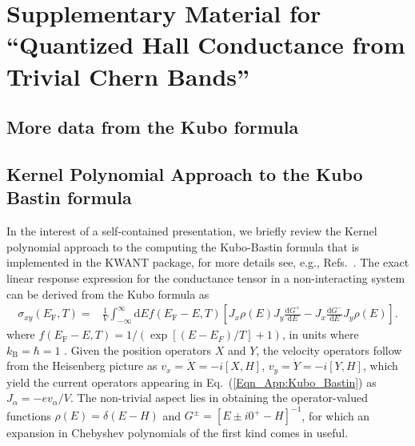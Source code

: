 \documentclass[aps,prl,amsmath,amssymb,twocolumn]{revtex4-2}
\newcommand{\eq}[1]{Eq.~(\ref{#1})}
\begin{document}
\appendix

\onecolumngrid
\section{Supplementary Material for ``Quantized Hall Conductance from Trivial Chern Bands'' }
\subsection{More data from the Kubo formula} 

\subsection{Kernel Polynomial Approach to the Kubo Bastin formula} 
In the interest of a self-contained presentation, we briefly review the Kernel polynomial approach to the computing the Kubo-Bastin formula that is implemented in the KWANT package, for more details see, e.g., Refs.~\cite{Kubo_bastin_KPM_1, Kubo_bastin_KPM_2, KPM_Review}. The exact linear response expression for the conductance tensor in a non-interacting system can be derived from the Kubo formula as 
\begin{align}
\sigma_{xy}(E_\mathrm{F}, T) =& \frac{1}{V} \int_{-\infty}^\infty \mathrm{d} E f(E_\mathrm{F} - E, T) \left[{J}_x \rho(E) {J}_y \frac{\mathrm{d} G^+}{\mathrm{d} E}  -  J_x \frac{\mathrm{d} G^-}{\mathrm{d} E} { J}_y  \rho(E)  \right].\label{Eqn_App:Kubo_Bastin}
\end{align}
where $f(E_\mathrm{F} - E, T) = 1 / (\exp[(E-E_F) / T] + 1)$, in units where $k_\mathrm{B} = \hbar = 1$ \cite{Kubo_Bastin, Kubo_Bastin_modern}. Given the position operators $X$ and $Y$, the velocity operators follow from the Heisenberg picture as $v_x = \dot X = -i [X, H]$, $v_y = \dot Y = -i [Y, H]$, which yield the current operators appearing in \eq{Eqn_App:Kubo_Bastin} as $J_\alpha = -e v_\alpha / V$. The non-trivial aspect lies in obtaining the operator-valued functions $\rho(E) = \delta(E - H)$ and $G^{\pm} = [E \pm i 0^+ - H]^{-1}$, for which an expansion in Chebyshev polynomials of the first kind comes in useful.
\end{document}
